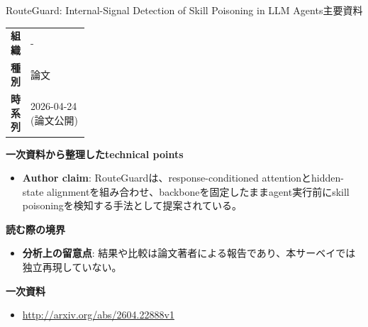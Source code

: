 \begin{technicalnote}{RouteGuard: Internal-Signal Detection of Skill Poisoning in LLM Agents}{主要資料}
\begingroup
\begin{tabularx}{\linewidth}{@{}>{\bfseries}p{0.22\linewidth}X@{}}
組織 & - \\
種別 & 論文 \\
時系列 & 2026-04-24 (論文公開) \\
\end{tabularx}
\smallskip
{\bfseries 一次資料から整理したtechnical points}
\begin{itemize}[leftmargin=1.5em,itemsep=0.35em]
\item \textbf{Author claim}: RouteGuardは、response-conditioned attentionとhidden-state alignmentを組み合わせ、backboneを固定したままagent実行前にskill poisoningを検知する手法として提案されている。
\end{itemize}
{\bfseries 読む際の境界}
\begin{itemize}[leftmargin=1.5em,itemsep=0.35em]
\item \textbf{分析上の留意点}: 結果や比較は論文著者による報告であり、本サーベイでは独立再現していない。
\end{itemize}
\begin{samepage}
{\bfseries 一次資料}
\begingroup\sloppy
\begin{itemize}[leftmargin=1.5em,itemsep=0.25em]
\item {\scriptsize\url{http://arxiv.org/abs/2604.22888v1}}
\end{itemize}
\endgroup
\end{samepage}
\endgroup
\end{technicalnote}
\medskip

